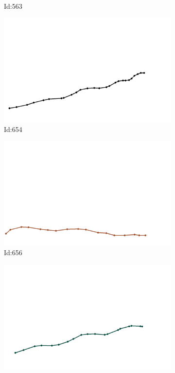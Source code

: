 \documentclass[12pt,twoside]{report}
\begin{document}
\begin{figure}
\begin{subfigure}[b]{0.20\textwidth}
\caption{Id:563}
\end{subfigure}
\begin{subfigure}[b]{0.20\textwidth}
\centering
\includegraphics[width=\textwidth]{../trajectories/654.png}
\caption{Id:654}
\end{subfigure}
\begin{subfigure}[b]{0.20\textwidth}
\centering
\includegraphics[width=\textwidth]{../trajectories/656.png}
\caption{Id:656}
\end{subfigure}
\begin{subfigure}[b]{0.20\textwidth}
\centering
\includegraphics[width=\textwidth]{../trajectories/671.png}

\end{subfigure}
\end{figure}
\end{document}
